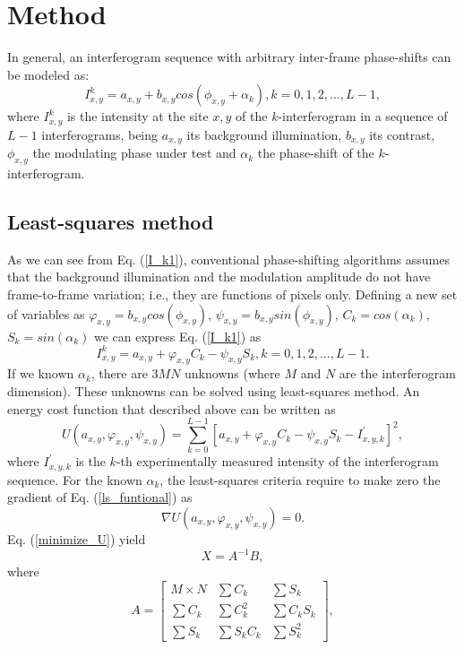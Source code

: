 \documentclass[letterpaper,12pt]{article}   %
\begin{document}
\section{Method}

In general, an interferogram sequence with arbitrary inter-frame phase-shifts can be modeled as: 
\begin{equation}\label{I_k1}
I_{x,y}^k=a_{x,y}+b_{x,y}cos(\phi_{x,y}+\alpha_k), k=0,1,2,...,L-1,
\end{equation}
where $I_{x,y}^k$ is the intensity at the site $x,y$ of the $k$-interferogram in a sequence of $L-1$ interferograms, being $a_{x,y}$ its background illumination, $b_{x,y}$ its contrast, $\phi_{x,y}$ the modulating phase under test and $\alpha_k$ the phase-shift of the $k$-interferogram.

\subsection{Least-squares method}
As we can see from Eq. (\ref{I_k1}), conventional phase-shifting algorithms assumes that the background illumination and the modulation amplitude do not have frame-to-frame variation; i.e., they are functions of pixels only. Defining a new set of variables as $\varphi_{x,y}=b_{x,y}cos(\phi_{x,y})$, $\psi_{x,y}=b_{x,y}sin(\phi_{x,y})$, $C_k=cos(\alpha_k)$, $S_k=sin(\alpha_k)$ we can express Eq. (\ref{I_k1}) as
\begin{equation}\label{I_k2}
I_{x,y}^k=a_{x,y}+\varphi_{x,y}C_k-\psi_{x,y}S_k, k=0,1,2,...,L-1.
\end{equation}
If we known $\alpha_k$, there are $3MN$ unknowns (where $M$ and $N$ are the interferogram dimension). These unknowns can be solved using least-squares method. An energy cost function that described above can be written as
\begin{equation}\label{ls_funtional}
U(a_{x,y},\varphi_{x,y},\psi_{x,y})=\sum_{k=0}^{L-1} [a_{x,y}+\varphi_{x,y}C_k-\psi_{x,y}S_k-I_{x,y,k}^{'}]^2,
\end{equation}
where $I_{x,y,k}^{'}$ is the $k$-th experimentally measured intensity of the interferogram sequence. For the known $\alpha_k$, the least-squares criteria require to make zero the gradient of Eq. (\ref{ls_funtional}) as
\begin{equation}\label{minimize_U}
\nabla U(a_{x,y},\varphi_{x,y},\psi_{x,y})=0.
\end{equation}
Eq. (\ref{minimize_U}) yield
\begin{equation}\label{x=AB}
X = A^{-1} B,
\end{equation}
where
\begin{equation}\label{A}
A = \left[ \begin{array}{ccc}
M\times N & \sum C_k     & \sum S_k \\
\sum C_k  & \sum C_k^2   & \sum C_k S_k \\
\sum S_k  & \sum S_k C_k & \sum S_k^2\end{array} \right],
\end{equation}
\end{document}
